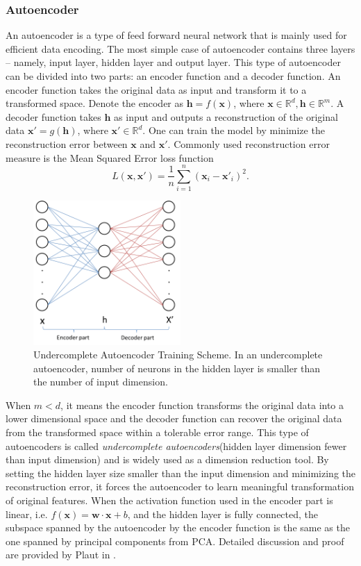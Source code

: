 \documentclass[11pt,a4paper]{article}
\theoremstyle{definition}
\numberwithin{equation}{section}
\let\vec\mathbf
\begin{document}
	\subsubsection{Autoencoder}
	An autoencoder is a type of feed forward neural network that is mainly used for efficient data encoding\cite[chapter 14]{Deep_Learning}. The most simple case of autoencoder contains three layers -- namely, input layer, hidden layer and output layer. This type of autoencoder can be divided into two parts: an encoder function and a decoder function. An encoder function takes the original data as input and transform it to a transformed space. Denote the encoder as $\vec h = f(\vec x)$, where $\vec x\in \mathbb R^d, \vec h\in \mathbb R^m$. A decoder function takes $\vec h$ as input and outputs a reconstruction of the original data $\vec x' = g(\vec h)$, where $\vec x'\in \mathbb R^d$. One can train the model by minimize the reconstruction error between $\vec x$ and $\vec x'$. Commonly used reconstruction error measure is the Mean Squared Error loss function 
	\begin{equation}
	L(\vec x,\vec x') = \frac{1}{n}\sum_{i=1}^{n}(\vec x_i-\vec x'_i)^2. 
	\end{equation}
	\begin{figure}[h!]
		\centering
		\includegraphics[width=0.5\textwidth]{ae.png}
		\caption{Undercomplete Autoencoder Training Scheme. In an undercomplete autoencoder, number of neurons in the hidden layer is smaller than the number of input dimension.}
	\end{figure}

	
	When $m<d$, it means the encoder function transforms the original data into a lower dimensional space and the decoder function can recover the original data from the transformed space within a tolerable error range. This type of autoencoders is called \textit{undercomplete autoencoders}(hidden layer dimension fewer than input dimension) and is widely used as a dimension reduction tool. By setting the hidden layer size smaller than the input dimension and minimizing the reconstruction error, it forces the autoencoder to learn meaningful transformation of original features.
	When the activation function used in the encoder part is linear, i.e. $f(\vec x) = \vec w\cdot\vec x + b$, and the hidden layer is fully connected, the subspace spanned by the autoencoder by the encoder function is the same as the one spanned by principal components from PCA. Detailed discussion and proof are provided by Plaut in \cite{Plaut}.
	
\end{document}
